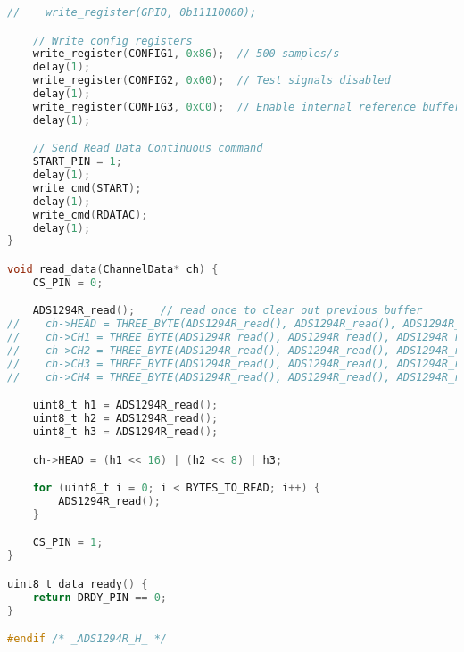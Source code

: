 \begin{lstlisting}[language=C]
//    write_register(GPIO, 0b11110000);

    // Write config registers
    write_register(CONFIG1, 0x86);  // 500 samples/s
    delay(1);
    write_register(CONFIG2, 0x00);  // Test signals disabled
    delay(1);
    write_register(CONFIG3, 0xC0);  // Enable internal reference buffer, no RLD
    delay(1);

    // Send Read Data Continuous command
    START_PIN = 1;
    delay(1);
    write_cmd(START);
    delay(1);
    write_cmd(RDATAC);
    delay(1);
}

void read_data(ChannelData* ch) {
    CS_PIN = 0;

    ADS1294R_read();    // read once to clear out previous buffer
//    ch->HEAD = THREE_BYTE(ADS1294R_read(), ADS1294R_read(), ADS1294R_read());
//    ch->CH1 = THREE_BYTE(ADS1294R_read(), ADS1294R_read(), ADS1294R_read());
//    ch->CH2 = THREE_BYTE(ADS1294R_read(), ADS1294R_read(), ADS1294R_read());
//    ch->CH3 = THREE_BYTE(ADS1294R_read(), ADS1294R_read(), ADS1294R_read());
//    ch->CH4 = THREE_BYTE(ADS1294R_read(), ADS1294R_read(), ADS1294R_read());

    uint8_t h1 = ADS1294R_read();
    uint8_t h2 = ADS1294R_read();
    uint8_t h3 = ADS1294R_read();

    ch->HEAD = (h1 << 16) | (h2 << 8) | h3;

    for (uint8_t i = 0; i < BYTES_TO_READ; i++) {
        ADS1294R_read();
    }

    CS_PIN = 1;
}

uint8_t data_ready() {
    return DRDY_PIN == 0;
}

#endif /* _ADS1294R_H_ */
\end{lstlisting}
